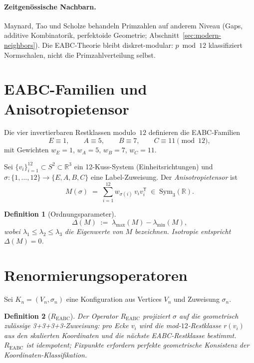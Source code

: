 \documentclass[11pt,a4paper]{article}
\newtheorem{definition}{Definition}
\newcommand{\R}{\mathbb{R}}
\begin{document}
	\paragraph{Zeitgenössische Nachbarn.}
	Maynard, Tao und Scholze behandeln Primzahlen auf anderem Niveau
	(Gaps, additive Kombinatorik, perfektoide Geometrie; Abschnitt~\ref{sec:modern-neighbors}).
	Die EABC-Theorie bleibt diskret-modular: $p\bmod 12$ klassifiziert Normschalen,
	nicht die Primzahlverteilung selbst.
	
	\section{EABC-Familien und Anisotropietensor}
	
	Die vier invertierbaren Restklassen modulo~$12$ definieren die EABC-Familien
	\[
	E \equiv 1,\qquad A \equiv 5,\qquad B \equiv 7,\qquad C \equiv 11 \pmod{12},
	\]
	mit Gewichten $w_E=1$, $w_A=5$, $w_B=7$, $w_C=11$.
	
	Sei $\{v_i\}_{i=1}^{12}\subset S^2\subset\R^3$ ein 12-Kuss-System (Einheitsrichtungen)
	und $\sigma\colon\{1,\ldots,12\}\to\{E,A,B,C\}$ eine Label-Zuweisung.
	Der \emph{Anisotropietensor} ist
	\[
	M(\sigma)
	\;=\;
	\sum_{i=1}^{12} w_{\sigma(i)}\, v_i v_i^{\mathsf T}
	\;\in\;
	\mathrm{Sym}_3(\R).
	\]
	
	\begin{definition}[Ordnungsparameter]
		\[
		\Delta(M) \;:=\; \lambda_{\max}(M) - \lambda_{\min}(M),
		\]
		wobei $\lambda_1\le\lambda_2\le\lambda_3$ die Eigenwerte von $M$ bezeichnen.
		Isotropie entspricht $\Delta(M)=0$.
	\end{definition}
	
	\section{Renormierungsoperatoren}
	
	Sei $K_n=(V_n,\sigma_n)$ eine Konfiguration aus Vertices $V_n$ und Zuweisung $\sigma_n$.
	
	\begin{definition}[$R_{\mathrm{EABC}}$]
		Der Operator $R_{\mathrm{EABC}}$ projiziert $\sigma$ auf die geometrisch zulässige
		3+3+3+3-Zuweisung: pro Ecke $v_i$ wird die mod-$12$-Restklasse
		$r(v_i)$ aus den skalierten Koordinaten und die nächste EABC-Restklasse
		bestimmt. $R_{\mathrm{EABC}}$ ist idempotent; Fixpunkte erfordern perfekte
		geometrische Konsistenz der Koordinaten-Klassifikation.
	\end{definition}
	
\end{document}
